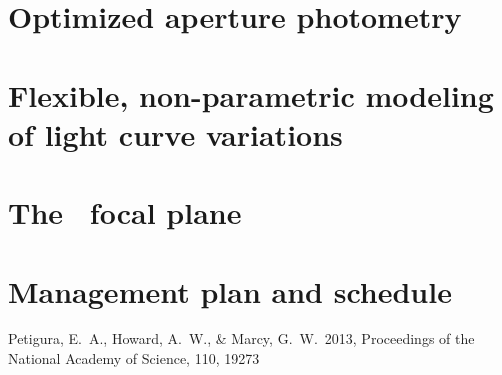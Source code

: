 \documentclass[letterpaper,12pt,preprint]{hack_aastex}
\begin{document}
\section{Optimized aperture photometry}

\section{Flexible, non-parametric modeling of light curve variations}

\section{The \Kepler\ focal plane}

\section{Management plan and schedule}

\clearpage
\begin{thebibliography}{}\raggedright%

Petigura, E.~A., Howard, A.~W., \& Marcy, G.~W.\ 2013,
Proceedings of the National Academy of Science, 110, 19273

\end{thebibliography}
\end{document}
